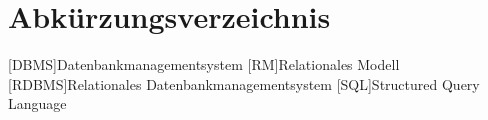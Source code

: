 \section*{Abkürzungsverzeichnis}


\begin{acronym}
    [DBMS]{Datenbankmanagementsystem}
    [RM]{Relationales Modell}
    [RDBMS]{Relationales Datenbankmanagementsystem}
    [SQL]{Structured Query Language}
\end{acronym}